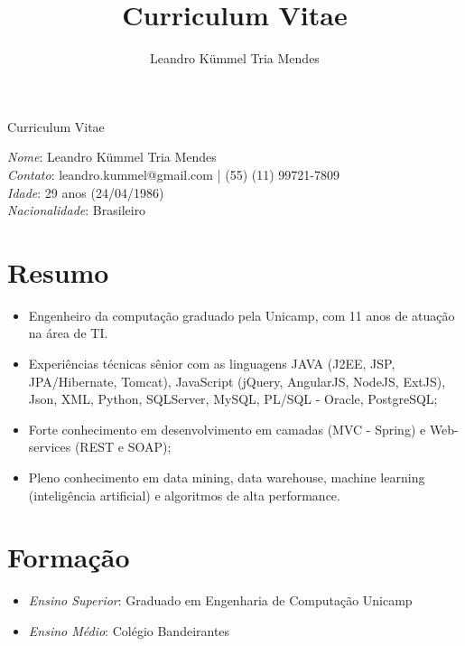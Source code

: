 \documentclass[a4paper,11pt]{article}
\title{Curriculum Vitae}
\author{Leandro Kümmel Tria Mendes}
\begin{document}
\begin{center} 
Curriculum Vitae
\end{center} 
\emph{Nome}: Leandro Kümmel Tria Mendes\\
\emph{Contato}: leandro.kummel@gmail.com | (55) (11) 99721-7809\\
\emph{Idade}: 29 anos (24/04/1986)\\
\emph{Nacionalidade}: Brasileiro\\
\section{Resumo}
\begin{itemize}
\item Engenheiro da computação graduado pela Unicamp, com 11 anos de atuação na área de TI.
\item Experiências técnicas sênior com as linguagens JAVA (J2EE, JSP, JPA/Hibernate, Tomcat), JavaScript (jQuery, AngularJS, NodeJS, ExtJS), Json, XML, Python, SQLServer, MySQL, PL/SQL - Oracle, PostgreSQL;
\item Forte conhecimento em desenvolvimento em camadas (MVC - Spring) e Web-services (REST e SOAP);
\item Pleno conhecimento em data mining, data warehouse, machine learning (inteligência artificial) e algoritmos de alta performance.
\end{itemize}

\section{Formação}
\begin{itemize}
\item \emph{Ensino Superior}: Graduado em Engenharia de Computação Unicamp 
\item \emph{Ensino Médio}: Colégio Bandeirantes

\end{itemize}
\end{document}
